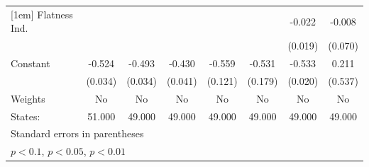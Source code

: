 {\begin{tabular}{l*{7}{c}}
[1em]
Flatness Ind.&                     &                     &                     &                     &                     &      -0.022         &      -0.008         \\
            &                     &                     &                     &                     &                     &     (0.019)         &     (0.070)         \\
[1em]
Constant    &      -0.524\sym{***}&      -0.493\sym{***}&      -0.430\sym{***}&      -0.559\sym{***}&      -0.531\sym{***}&      -0.533\sym{***}&       0.211         \\
            &     (0.034)         &     (0.034)         &     (0.041)         &     (0.121)         &     (0.179)         &     (0.020)         &     (0.537)         \\
\hline
Weights     &          No         &          No         &          No         &          No         &          No         &          No         &          No         \\
States:     &      51.000         &      49.000         &      49.000         &      49.000         &      49.000         &      49.000         &      49.000         \\
\hline\hline
\multicolumn{8}{l}{\footnotesize Standard errors in parentheses}\\
\multicolumn{8}{l}{\footnotesize \sym{*} \(p<0.1\), \sym{**} \(p<0.05\), \sym{***} \(p<0.01\)}\\
\end{tabular}
}
